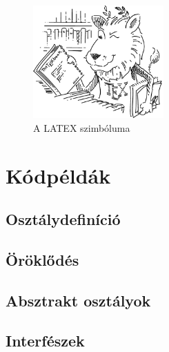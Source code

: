 \documentclass[]{thesis-ekf}
\theoremstyle{definition}
\begin{document}
	\begin{figure} [!ht]
		\centering
		\includegraphics[width=5cm]{lion}
		\caption{A LATEX szimbóluma} 
		\label{fig:LION}
	\end{figure}
	
	\chapter{Kódpéldák}\label{fejezet-peldak}
	
	\section{Osztálydefiníció}
	
	
	
	
	
	\section{Öröklődés}
	
	
	
	\section{Absztrakt osztályok}
	
	
	
	
	
	\section{Interfészek}
	
\end{document}
